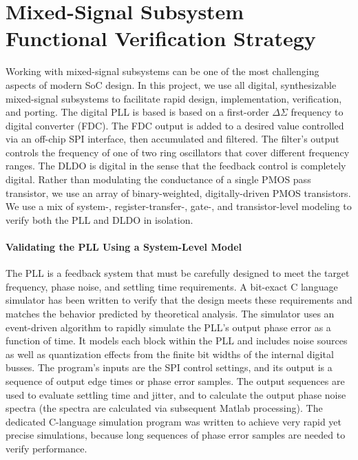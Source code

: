 
\section{Mixed-Signal Subsystem Functional Verification Strategy}

Working with mixed-signal subsystems can be one of the most challenging
aspects of modern SoC design. In this project, we use all digital,
synthesizable mixed-signal subsystems to facilitate rapid design,
implementation, verification, and porting. The digital PLL is based is
based on a first-order $\Delta\Sigma$ frequency to digital converter
(FDC). The FDC output is added to a desired value controlled via an
off-chip SPI interface, then accumulated and filtered. The filter's
output controls the frequency of one of two ring oscillators that cover
different frequency ranges. The DLDO is digital in the sense that the
feedback control is completely digital. Rather than modulating the
conductance of a single PMOS pass transistor, we use an array of
binary-weighted, digitally-driven PMOS transistors. We use a mix of
system-, register-transfer-, gate-, and transistor-level modeling to
verify both the PLL and DLDO in isolation.

\paragraph{Validating the PLL Using a System-Level Model}
The PLL is a feedback system that must be carefully designed to meet the
target frequency, phase noise, and settling time requirements. A
bit-exact C language simulator has been written to verify that the design
meets these requirements and matches the behavior predicted by
theoretical analysis. The simulator uses an event-driven algorithm to
rapidly simulate the PLL's output phase error as a function of time. It
models each block within the PLL and includes noise sources as well as
quantization effects from the finite bit widths of the internal digital
busses. The program's inputs are the SPI control settings, and its output
is a sequence of output edge times or phase error samples. The output
sequences are used to evaluate settling time and jitter, and to calculate
the output phase noise spectra (the spectra are calculated via subsequent
Matlab processing). The dedicated C-language simulation program was
written to achieve very rapid yet precise simulations, because long
sequences of phase error samples are needed to verify performance.

